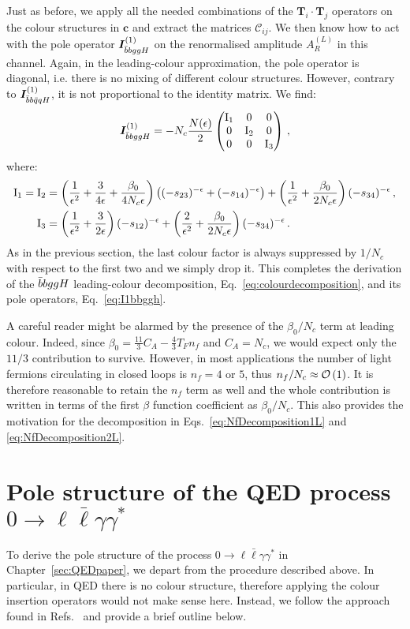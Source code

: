 \documentclass[main.tex]{subfiles}
\begin{document}
Just as before, we apply all the needed combinations of the $\bm{T}_i \cdot \bm{T}_j$ operators on the colour structures in $\bm{c}$ and extract the matrices $\mathcal{C}_{ij}$. We then know how to act with the pole operator $\bm{I}_{\bar{b}bggH}^{(1)}$ on the renormalised amplitude $A_R^{(L)}$ in this channel. Again, in the leading-colour approximation, the pole operator is diagonal, i.e. there is no mixing of different colour structures. However, contrary to $\bm{I}_{\bar{b}b\bar{q}qH}^{(1)}$, it is not proportional to the identity matrix. We find:
\begin{equation*}
    \bm{I}_{\bar{b}bggH}^{(1)} = -N_c \frac{N(\epsilon)}{2}
    \begin{pmatrix}
        \mathrm{I}_1 & 0 & 0\\
        0 & \mathrm{I}_2 & 0\\
        0 & 0 & \mathrm{I}_3
    \end{pmatrix}\,,
\end{equation*}
where:
\begin{align}
    \mathrm{I}_1 = \mathrm{I}_2 &= \left(\frac{1}{\epsilon^2} + \frac{3}{4\epsilon} + \frac{\beta_0}{4 N_c \epsilon}\right) \left((-s_{23})^{-\epsilon} + (-s_{14})^{-\epsilon}\right) +\left(\frac{1}{\epsilon^2} + \frac{\beta_0}{2 N_c\epsilon} \right) (-s_{34})^{-\epsilon}\,, \nonumber \\
    \mathrm{I}_3 &= \left(\frac{1}{\epsilon^2} + \frac{3}{2\epsilon} \right) (-s_{12})^{-\epsilon} + \left(\frac{2}{\epsilon^2} + \frac{\beta_0}{2 N_c \epsilon} \right) (-s_{34})^{-\epsilon}\,.
\end{align}
As in the previous section, the last colour factor is always suppressed by $1/N_c$ with respect to the first two and we simply drop it. This completes the derivation of the $\bar{b}bggH$ leading-colour decomposition, Eq.~\ref{eq:colourdecomposition}, and its pole operators, Eq.~\ref{eq:I1bbggh}.

A careful reader might be alarmed by the presence of the $\beta_0/N_c$ term at leading colour. Indeed, since $\beta_0 = \frac{11}{3}C_A - \frac{4}{3} T_F n_f$ and $C_A = N_c$, we would expect only the $11/3$ contribution to survive. However, in most applications the number of light fermions circulating in closed loops is $n_f=4$ or $5$, thus $n_f/N_c \approx  \mathcal{O}\left(1\right)$. It is therefore reasonable to retain the $n_f$ term as well and the whole contribution is written in terms of the first $\beta$ function coefficient as $\beta_0/N_c$. This also provides the motivation for the decomposition in Eqs.~\ref{eq:NfDecomposition1L} and \ref{eq:NfDecomposition2L}.
\section{Pole structure of the QED process $0\to \ell \bar\ell \gamma \gamma^*$} \label{app:QEDpolestructure}
To derive the pole structure of the process $0\to \ell \bar\ell \gamma \gamma^*$ in Chapter~\ref{sec:QEDpaper}, we depart from the procedure described above. In particular, in QED there is no colour structure, therefore applying the colour insertion operators would not make sense here. Instead, we follow the approach found in Refs.~\cite{Gardi:2009qi, Gardi:2009zv, Becher:2009cu, Becher:2009qa} and provide a brief outline below.
\end{document}

